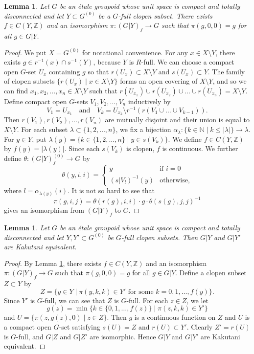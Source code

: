 \documentclass[11pt]{article}
\newtheorem{lem}[thm]{Lemma}
\theoremstyle{definition}
\newcommand{\N}{\mathbb{N}}
\newcommand{\Z}{\mathbb{Z}}
\begin{document}
\begin{lem}\label{tower1}
Let $G$ be an \'etale groupoid 
whose unit space is compact and totally disconnected and 
let $Y\subset G^{(0)}$ be a $G$-full clopen subset. 
There exists $f\in C(Y,\Z)$ and an isomorphism $\pi:(G|Y)_f\to G$ 
such that $\pi(g,0,0)=g$ for all $g\in G|Y$. 
\end{lem}
\begin{proof}
We put $X=G^{(0)}$ for notational convenience. 
For any $x\in X\setminus Y$, 
there exists $g\in r^{-1}(x)\cap s^{-1}(Y)$, because $Y$ is $R$-full. 
We can choose a compact open $G$-set $U_x$ containing $g$ 
so that $r(U_x)\subset X\setminus Y$ and $s(U_x)\subset Y$. 
The family of clopen subsets $\{r(U_x)\mid x\in X\setminus Y\}$ 
forms an open covering of $X\setminus Y$, 
and so we can find $x_1,x_2,\dots,x_n\in X\setminus Y$ such that 
$r(U_{x_1})\cup r(U_{x_2})\cup\dots\cup r(U_{x_n})=X\setminus Y$. 
Define compact open $G$-sets $V_1,V_2,\dots,V_n$ inductively by 
\[
V_1=U_{x_1} \quad \text{and} \quad
V_k=U_{x_k}\setminus r^{-1}(r(V_1\cup\dots\cup V_{k-1})). 
\]
Then $r(V_1),r(V_2),\dots,r(V_n)$ are mutually disjoint and 
their union is equal to $X\setminus Y$. 
For each subset $\lambda\subset\{1,2,\dots,n\}$, 
we fix a bijection 
$\alpha_\lambda:\{k\in\N\mid k\leq\lvert\lambda\rvert\}\to\lambda$. 
For $y\in Y$, 
put $\lambda(y)=\{k\in\{1,2,\dots,n\}\mid y\in s(V_k)\}$. 
We define $f\in C(Y,\Z)$ by $f(y)=\lvert\lambda(y)\rvert$. 
Since each $s(V_k)$ is clopen, $f$ is continuous. 
We further define $\theta:(G|Y)_f^{(0)}\to G$ by 
\[
\theta(y,i,i)=\begin{cases}
y & \text{if }i=0 \\
(s|V_l)^{-1}(y) & \text{otherwise}, \end{cases}
\]
where $l=\alpha_{\lambda(y)}(i)$. 
It is not so hard to see that 
\[
\pi(g,i,j)=\theta(r(g),i,i)\cdot g\cdot\theta(s(g),j,j)^{-1}
\]
gives an isomorphism from $(G|Y)_f$ to $G$. 
\end{proof}

\begin{lem}\label{tower2}
Let $G$ be an \'etale groupoid 
whose unit space is compact and totally disconnected and 
let $Y,Y'\subset G^{(0)}$ be $G$-full clopen subsets. 
Then $G|Y$ and $G|Y'$ are Kakutani equivalent. 
\end{lem}
\begin{proof}
By Lemma \ref{tower1}, 
there exists $f\in C(Y,\Z)$ and an isomorphism $\pi:(G|Y)_f\to G$ such that 
$\pi(g,0,0)=g$ for all $g\in G|Y$. 
Define a clopen subset $Z\subset Y$ by 
\[
Z=\{y\in Y\mid\pi(y,k,k)\in Y'\text{ for some }k=0,1,\dots,f(y)\}. 
\]
Since $Y'$ is $G$-full, we can see that $Z$ is $G$-full. 
For each $z\in Z$, we let 
\[
g(z)=\min\{k\in\{0,1,\dots,f(z)\}\mid\pi(z,k,k)\in Y'\}
\]
and 
$U=\{\pi(z,g(z),0)\mid z\in Z\}$. 
Then $g$ is a continuous function on $Z$ and 
$U$ is a compact open $G$-set satisfying $s(U)=Z$ and $r(U)\subset Y'$. 
Clearly $Z'=r(U)$ is $G$-full, and $G|Z$ and $G|Z'$ are isomorphic. 
Hence $G|Y$ and $G|Y'$ are Kakutani equivalent. 
\end{proof}
\end{document}

